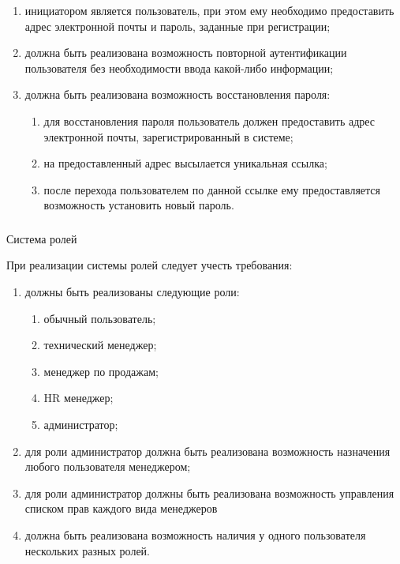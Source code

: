 \begin{enumerate}
  \item инициатором является пользователь, при этом ему необходимо предоставить адрес электронной почты и пароль,
  заданные при регистрации;
  \item должна быть реализована возможность повторной аутентификации пользователя без необходимости ввода
  какой-либо информации;
	\item должна быть реализована возможность восстановления пароля:
	\begin{enumerate}
		\item для восстановления пароля пользователь должен предоставить адрес электронной почты, зарегистрированный в системе;
		\item на предоставленный адрес высылается уникальная ссылка;
		\item после перехода пользователем по данной ссылке ему предоставляется возможность установить новый пароль.
	\end{enumerate}
\end{enumerate}

\subsubsection{} Система ролей
\label{sec:domain:specification:roles}

При реализации системы ролей следует учесть требования:

\begin{enumerate}
	\item должны быть реализованы следующие роли:
	\begin{enumerate}
		\item обычный пользователь;
		\item технический менеджер;
		\item менеджер по продажам;
		\item HR менеджер;
		\item администратор;
	\end{enumerate}
	\item для роли администратор должна быть реализована возможность назначения любого пользователя менеджером;
	\item для роли администратор должны быть реализована возможность управления списком прав каждого вида менеджеров
	\item должна быть реализована возможность наличия у одного пользователя нескольких разных ролей.
\end{enumerate}

